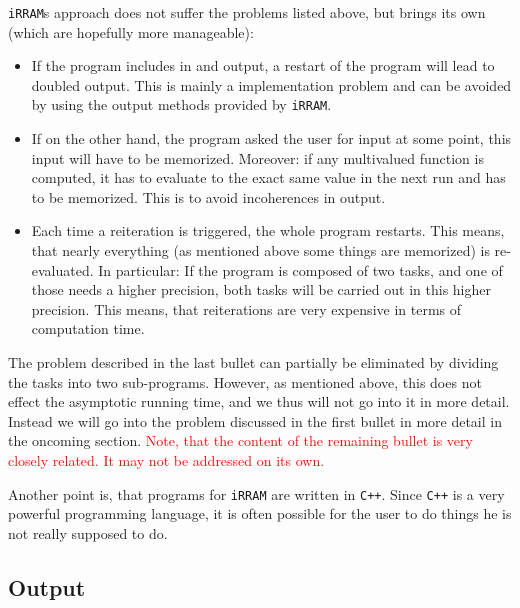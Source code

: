 \documentclass{article}
\newcommand{\irram}{\texttt{iRRAM}\xspace}
\newcommand{\irrams}{\texttt{iRRAM}s\xspace}
\newcommand{\cc}{\texttt{C++}\xspace}
\newcommand{\temp}[1]{\textcolor{red}{#1}}
\begin{document}
\irrams approach does not suffer the problems listed above, but brings its own (which are hopefully more manageable):
\begin{itemize}
\item If the program includes in and output, a restart of the program will lead to doubled output. This is mainly a implementation problem and can be avoided by using the output methods provided by \irram.
\item If on the other hand, the program asked the user for input at some point, this input will have to be memorized. Moreover: if any multivalued function is computed, it has to evaluate to the exact same value in the next run and has to be memorized. This is to avoid incoherences in output.
\item Each time a reiteration is triggered, the whole program restarts. This means, that nearly everything (as mentioned above some things are memorized) is re-evaluated. In particular: If the program is composed of two tasks, and one of those needs a higher precision, both tasks will be carried out in this higher precision. This means, that reiterations are very expensive in terms of computation time.
\end{itemize}

The problem described in the last bullet can partially be eliminated by dividing the tasks into two sub-programs. However, as mentioned above, this does not effect the asymptotic running time, and we thus will not go into it in more detail. Instead we will go into the problem discussed in the first bullet in more detail in the oncoming section. \temp{Note, that the content of the remaining bullet is very closely related. It may not be addressed on its own.}

Another point is, that programs for \irram are written in \cc. Since \cc is a very powerful programming language, it is often possible for the user to do things he is not really supposed to do.

\subsection{Output}
\end{document}
